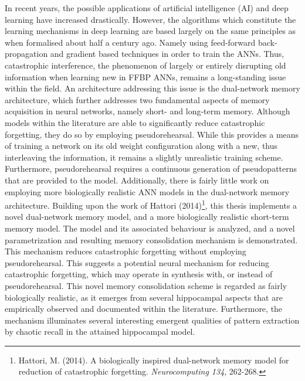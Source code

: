 {\fontsize{9}{8}\selectfont 
In recent years, the possible applications of artificial intelligence (AI) and deep learning have increased drastically. However, the algorithms which constitute the learning mechanisms in deep learning are based largely on the same principles as when formalised about half a century ago. Namely using feed-forward back-propagation and gradient based techniques in order to train the ANNs.
Thus, catastrophic interference, the phenomenon of largely or entirely disrupting old information when learning new in FFBP ANNs, remains a long-standing issue within the field.
An architecture addressing this issue is the dual-network memory architecture, which further addresses two fundamental aspects of memory acquisition in neural networks, namely short- and long-term memory. Although models within the literature are able to significantly reduce catastrophic forgetting,  they do so by employing pseudorehearsal. While this provides a means of training a network on its old weight configuration along with a new, thus interleaving the information, it remains a slightly unrealistic training scheme. Furthermore, pseudorehearsal requires a continuous generation of pseudopatterns that are provided to the model. Additionally, there is fairly little work on employing more biologically realistic ANN models in the dual-network memory architecture. Building upon the work of Hattori (2014)\footnote{Hattori, M. (2014).  A biologically inspired dual-network memory model for reduction of catastrophic forgetting. \textit{Neurocomputing 134}, 262-268.}, this thesis implements a novel dual-network memory model, and a more biologically realistic short-term memory model. The model and its associated behaviour is analyzed, and a novel parametrization and resulting memory consolidation mechanism is demonstrated. This mechanism reduces catastrophic forgetting without employing pseudorehearsal. This suggests a potential neural mechanism for reducing catastrophic forgetting, which may operate in synthesis with, or instead of pseudorehearsal. This novel memory consolidation scheme is regarded as fairly biologically realistic, as it emerges from several hippocampal aspects that are empirically observed and documented within the literature. Furthermore, the mechanism illuminates several interesting emergent qualities of pattern extraction by chaotic recall in the attained hippocampal model.
}

\clearpage